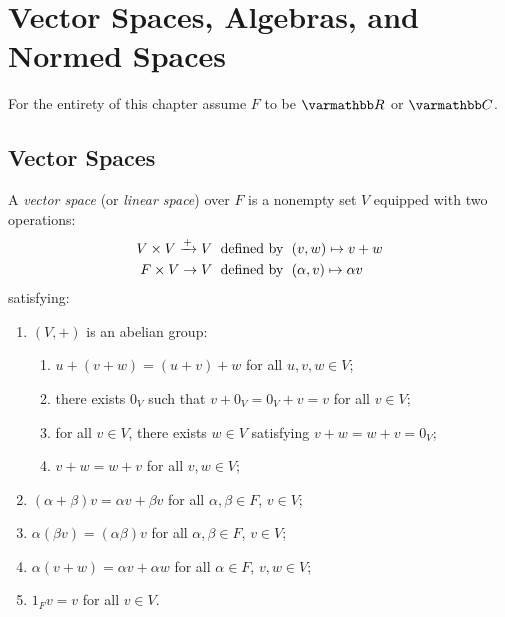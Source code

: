 \chapter{Vector Spaces, Algebras, and Normed Spaces}

\noindent For the entirety of this chapter assume $F$ to be  $\bfR$ or $\bfC$.

\section{Vector Spaces}
    \begin{definition}
        A \textit{vector space} (or \textit{linear space}) over $F$ is a nonempty set $V$ equipped with two operations:
            \begin{equation*}
            \begin{split}
                V \times V \xrightarrow{+} V &\hspace{6pt}\text{defined by}\hspace{6pt} (v,w) \mapsto v+w \\
                F \times V \rightarrow V &\hspace{6pt}\text{defined by}\hspace{6pt} (\alpha,v) \mapsto \alpha v
            \end{split}
            \end{equation*}
        satisfying:
            \begin{enumerate}[label = (\arabic*),itemsep=1pt,topsep=3pt]
                \item $(V, +)$ is an abelian group:
                    \begin{enumerate}[label = (\roman*),itemsep=1pt,topsep=3pt]
                        \item $u + (v+w) = (u+v) + w$ for all $u,v,w \in V$;
                        \item there exists $0_V$ such that $v + 0_V = 0_V + v = v$ for all $v \in V$;
                        \item for all $v \in V$, there exists $w \in V$ satisfying $v+w = w+v = 0_V$;
                        \item $v + w = w+v$ for all $v,w \in V$;
                    \end{enumerate}

                \item $(\alpha + \beta)v = \alpha v + \beta v$ for all $\alpha,\beta \in F$, $v \in V$;
                \item $\alpha(\beta v) = (\alpha \beta)v$ for all $\alpha,\beta \in F$, $v \in V$;
                \item $\alpha(v+w) = \alpha v + \alpha w$ for all $\alpha \in F$, $v,w \in V$;
                \item $1_F v = v$ for all $v \in V$.
            \end{enumerate}
    \end{definition}

